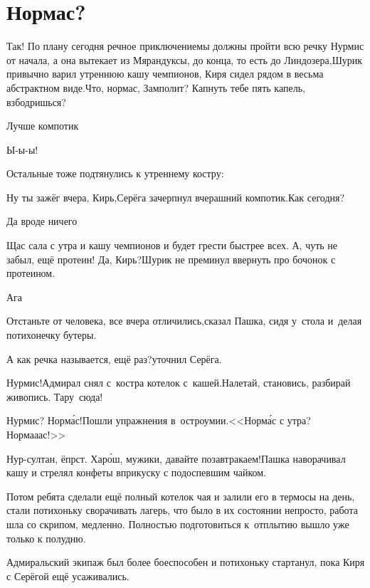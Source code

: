 \chapter{Нормас?}
\vepsianrose

\diagdash Так! По плану сегодня речное приключение\mdash мы должны пройти всю речку Нурмис от начала, а она вытекает из Мярандуксы, до конца, то есть до Линдозера,\mdash Шурик привычно варил утреннюю кашу чемпионов, Киря сидел рядом в весьма абстрактном виде.\mdash Что, нормас, Замполит? Капнуть тебе пять капель, взбодришься?

\diagdash Лучше компотик\myldots{}

\diagdash Ы-ы-ы!%

Остальные тоже подтянулись к утреннему костру:

\diagdash Ну ты зажёг вчера, Кирь,\mdash Серёга зачерпнул вчерашний компотик.\mdash Как сегодня?

\diagdash Да вроде ничего\myldots{}

\diagdash Щас сала с утра и кашу чемпионов и будет грести быстрее всех. А, чуть не забыл, ещё протеин! Да, Кирь?\mdash Шурик не преминул ввернуть про бочонок с протеином.

\diagdash Ага\myldots{}

\diagdash Отстаньте от человека, все вчера отличились,\mdash сказал Пашка, сидя у~стола и~делая потихонечку бутеры.

\diagdash А как речка называется, ещё раз?\mdash уточнил Серёга.

\diagdash Нурмис!\mdash Адмирал снял с~костра котелок с~кашей.\mdash Налетай, становись, разбирай живопись. Тару~сюда!

\diagdash Нурмис? Норм{\'а}с!\mdash Пошли упражнения в~остроумии.\mdash <<Норм{\'а}с с утра?  Норма\sdash а\sdash ас!>>

\diagdash Нур-султан, ёпрст. Хар{\'о}ш, мужики, давайте позавтракаем!\mdash Пашка наворачивал кашу и стрелял конфеты вприкуску с подоспевшим чайком.

Потом ребята сделали ещё полный котелок чая и залили его в термосы на день, стали потихоньку сворачивать лагерь, что было в их состоянии непросто, работа шла со скрипом, медленно. Полностью подготовиться к~отплытию вышло уже только к полудню.

Адмиральский экипаж был более боеспособен и потихоньку стартанул, пока Киря с Серёгой ещё усаживались. 

